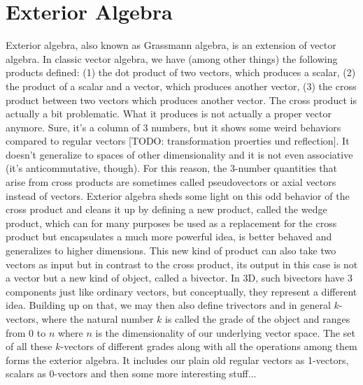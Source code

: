 \section{Exterior Algebra}
Exterior algebra, also known as Grassmann algebra, is an extension of vector algebra. In classic vector algebra, we have (among other things) the following products defined: (1) the dot product of two vectors, which produces a scalar, (2) the product of a scalar and a vector, which produces another vector, (3) the cross product between two vectors which produces another vector. The cross product is actually a bit problematic. What it produces is not actually a proper vector anymore. Sure, it's a column of 3 numbers, but it shows some weird behaviors compared to regular vectors [TODO: transformation proerties und reflection]. It doesn't generalize to spaces of other dimensionality and it is not even associative (it's anticommutative, though). For this reason, the 3-number quantities that arise from cross products are sometimes called pseudovectors or axial vectors instead of vectors. Exterior algebra sheds some light on this odd behavior of the cross product and cleans it up by defining a new product, called the wedge product, which can for many purposes be used as a replacement for the cross product but encapsulates a much more powerful idea, is better behaved and generalizes to higher dimensions. This new kind of product can also take two vectors as input but in contrast to the cross product, its output in this case is not a vector but a new kind of object, called a bivector. In 3D, such bivectors have 3 components just like ordinary vectors, but conceptually, they represent a different idea. Building up on that, we may then also define trivectors and in general $k$-vectors, where the natural number $k$ is called the grade of the object and ranges from $0$ to $n$ where $n$ is the dimensionality of our underlying vector space. The set of all these $k$-vectors of different grades along with all the operations among them forms the exterior algebra. It includes our plain old regular vectors as 1-vectors, scalars as 0-vectors and then some more interesting stuff...


